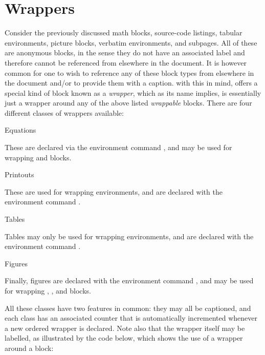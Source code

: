 \section[sec:wrappers]{Wrappers}

Consider the previously discussed math blocks, source-code listings, tabular
environments, picture blocks, verbatim environments, and subpages.  All of these are
anonymous blocks, in the sense they do not have an associated label and therefore
cannot be referenced from elsewhere in the document.   It is however common for one
to wish to reference any of these block types from elsewhere in the document and/or
to provide them with a caption.  with this in mind, \lambtex offers a special kind
of block known as a \emph{wrapper}, which as its name implies, is essentially just
a wrapper around any of the above listed \emph{wrappable} blocks.  There are four
different classes of wrappers available:

\begin{description}

\item{Equations}

    These are declared via the environment command , and
    may be used for wrapping  and  blocks.

\item{Printouts}

    These are used for wrapping  environments, and are
    declared with the environment command .

\item{Tables}

    Tables may only be used for wrapping  environments,
    and are declared with the environment command .

\item{Figures}

    Finally, figures are declared with the environment command
    , and may be used for wrapping ,
    , and  blocks.

\end{description}

All these classes have two features in common: they may all be captioned, and each
class has an associated counter that is automatically incremented whenever a new
ordered wrapper is declared.  Note also that the wrapper itself may be labelled, as
illustrated by the code below, which shows the use of a  wrapper around
a  block:

